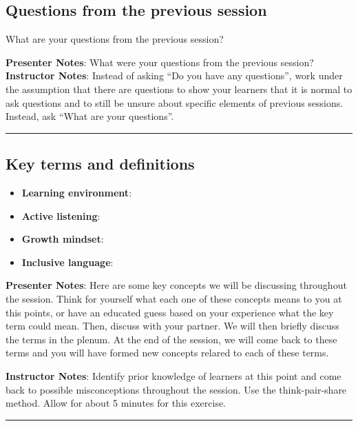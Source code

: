 \documentclass[
  letterpaper,
  DIV=11,
  numbers=noendperiod]{scrartcl}
\providecommand{\tightlist}{%
  \setlength{\itemsep}{0pt}\setlength{\parskip}{0pt}}
\begin{document}
\subsection{Questions from the previous
session}\label{questions-from-the-previous-session}

What are your questions from the previous session?

\textbf{Presenter Notes}: What were your questions from the previous
session? \textbf{Instructor Notes}: Instead of asking ``Do you have any
questions'', work under the assumption that there are questions to show
your learners that it is normal to ask questions and to still be unsure
about specific elements of previous sessions. Instead, ask ``What are
your questions''.

\begin{center}\rule{0.5\linewidth}{0.5pt}\end{center}

\subsection{Key terms and definitions}\label{key-terms-and-definitions}

\begin{itemize}
\tightlist
\item
  \textbf{Learning environment}:
\item
  \textbf{Active listening}:
\item
  \textbf{Growth mindset}:
\item
  \textbf{Inclusive language}:
\end{itemize}

\textbf{Presenter Notes}: Here are some key concepts we will be
discussing throughout the session. Think for yourself what each one of
these concepts means to you at this points, or have an educated guess
based on your experience what the key term could mean. Then, discuss
with your partner. We will then briefly discuss the terms in the plenum.
At the end of the session, we will come back to these terms and you will
have formed new concepts relared to each of these terms.

\textbf{Instructor Notes}: Identify prior knowledge of learners at this
point and come back to possible misconceptions throughout the session.
Use the think-pair-share method. Allow for about 5 minutes for this
exercise.

\begin{center}\rule{0.5\linewidth}{0.5pt}\end{center}
\end{document}
